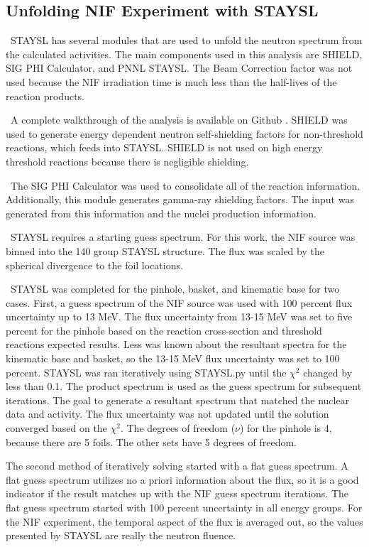 \documentclass[journal]{IEEEtran}
\begin{document}
	\subsection{Unfolding NIF Experiment with STAYSL}
	\ STAYSL has several modules that are used to unfold the neutron spectrum from the calculated activities. The main components used in this analysis are SHIELD, SIG PHI Calculator, and PNNL STAYSL. The Beam Correction factor was not used because the NIF irradiation time is much less than the half-lives of the reaction products. 
	 
	\ A complete walkthrough of the analysis is available on Github \cite{Me}. SHIELD was used to generate energy dependent neutron self-shielding factors for non-threshold reactions, which feeds into STAYSL. SHIELD is not used on high energy threshold reactions because there is negligible shielding. 
	
	\ The SIG PHI Calculator was used to consolidate all of the reaction information. Additionally, this module generates gamma-ray shielding factors. The input was generated from this information and the nuclei production information. 
	
	\ STAYSL requires a starting guess spectrum. For this work, the NIF source was binned into the 140 group STAYSL structure. The flux was scaled by the spherical divergence to the foil locations. 
	
	\ STAYSL was completed for the pinhole, basket, and kinematic base for two cases. First, a guess spectrum  of the NIF source was used with 100 percent flux uncertainty up to 13 MeV. The flux uncertainty from 13-15 MeV was set to five percent for the pinhole based on the reaction cross-section and threshold reactions expected results. Less was known about the resultant spectra for the kinematic base and basket, so the 13-15 MeV flux uncertainty was set to 100 percent. STAYSL was ran iteratively using STAYSL.py until the $\chi^{2}$ changed by less than 0.1. The product spectrum is used as the guess spectrum for subsequent iterations. The goal to generate a resultant spectrum that matched the nuclear data and activity. The flux uncertainty was not updated until the solution converged based on the $\chi^{2}$. The degrees of freedom ($\nu$) for the pinhole is 4, because there are 5 foils. The other sets have 5 degrees of freedom. 
	
	The second method of iteratively solving started with a flat guess spectrum. A flat guess spectrum utilizes no a priori information about the flux, so it is a good indicator if the result matches up with the NIF guess spectrum iterations. The flat guess spectrum started with 100 percent uncertainty in all energy groups. For the NIF experiment, the temporal aspect of the flux is averaged out, so the values presented by STAYSL are really the neutron fluence. 
	
\end{document}
